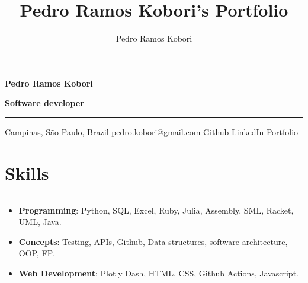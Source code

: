 \documentclass[a4paper,10pt]{article}
\title{Pedro Ramos Kobori's Portfolio}
\newcommand{\ulink}[2]{\href{#1}{\underline{#2}}}
\begin{document}
\date{}
\author{Pedro Ramos Kobori}

\noindent
\begin{minipage}[t]{0.5\textwidth}
  \begin{flushleft}
    \textbf{\Large Pedro Ramos Kobori}
  \end{flushleft}
\end{minipage}
\begin{minipage}[t]{0.5\textwidth}
  \begin{flushright}
    \textbf{\Large Software developer}
  \end{flushright}
\end{minipage}

\hrule

\vspace{2mm}
\noindent
{
  \centering
  Campinas, São Paulo, Brazil \textbar{}
  pedro.kobori@gmail.com \textbar{}
  \ulink{https://github.com/rokobo}{Github} \textbar{}
  \ulink{https://www.linkedin.com/in/pedrokobori/}{LinkedIn} \textbar{}
  \ulink{https://rokobo.github.io}{Portfolio}
  \par
}

\section*{Skills}
\hrule
\vspace{2mm}
\begin{itemize}[itemsep=0pt]
  \item \textbf{Programming}: Python, SQL, Excel, Ruby, Julia, Assembly, SML, Racket, UML, Java.
  \item \textbf{Concepts}: Testing, APIs, Github, Data structures, software architecture, OOP, FP.
  \item \textbf{Web Development}: Plotly Dash, HTML, CSS, Github Actions, Javascript.
\end{itemize}
\end{document}

